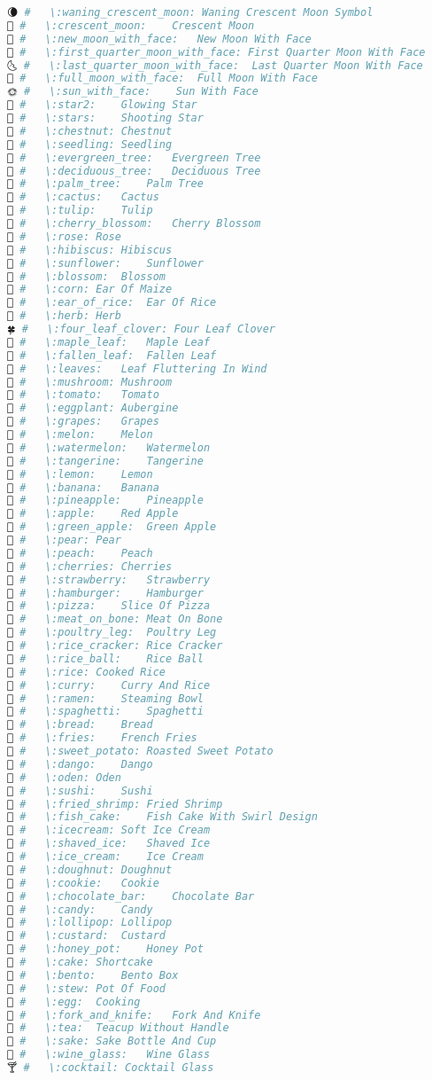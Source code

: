 \begin{lstlisting}[language=Julia]
🌘 #   \:waning_crescent_moon: Waning Crescent Moon Symbol
🌙 #   \:crescent_moon:    Crescent Moon
🌚 #   \:new_moon_with_face:   New Moon With Face
🌛 #   \:first_quarter_moon_with_face: First Quarter Moon With Face
🌜 #   \:last_quarter_moon_with_face:  Last Quarter Moon With Face
🌝 #   \:full_moon_with_face:  Full Moon With Face
🌞 #   \:sun_with_face:    Sun With Face
🌟 #   \:star2:    Glowing Star
🌠 #   \:stars:    Shooting Star
🌰 #   \:chestnut: Chestnut
🌱 #   \:seedling: Seedling
🌲 #   \:evergreen_tree:   Evergreen Tree
🌳 #   \:deciduous_tree:   Deciduous Tree
🌴 #   \:palm_tree:    Palm Tree
🌵 #   \:cactus:   Cactus
🌷 #   \:tulip:    Tulip
🌸 #   \:cherry_blossom:   Cherry Blossom
🌹 #   \:rose: Rose
🌺 #   \:hibiscus: Hibiscus
🌻 #   \:sunflower:    Sunflower
🌼 #   \:blossom:  Blossom
🌽 #   \:corn: Ear Of Maize
🌾 #   \:ear_of_rice:  Ear Of Rice
🌿 #   \:herb: Herb
🍀 #   \:four_leaf_clover: Four Leaf Clover
🍁 #   \:maple_leaf:   Maple Leaf
🍂 #   \:fallen_leaf:  Fallen Leaf
🍃 #   \:leaves:   Leaf Fluttering In Wind
🍄 #   \:mushroom: Mushroom
🍅 #   \:tomato:   Tomato
🍆 #   \:eggplant: Aubergine
🍇 #   \:grapes:   Grapes
🍈 #   \:melon:    Melon
🍉 #   \:watermelon:   Watermelon
🍊 #   \:tangerine:    Tangerine
🍋 #   \:lemon:    Lemon
🍌 #   \:banana:   Banana
🍍 #   \:pineapple:    Pineapple
🍎 #   \:apple:    Red Apple
🍏 #   \:green_apple:  Green Apple
🍐 #   \:pear: Pear
🍑 #   \:peach:    Peach
🍒 #   \:cherries: Cherries
🍓 #   \:strawberry:   Strawberry
🍔 #   \:hamburger:    Hamburger
🍕 #   \:pizza:    Slice Of Pizza
🍖 #   \:meat_on_bone: Meat On Bone
🍗 #   \:poultry_leg:  Poultry Leg
🍘 #   \:rice_cracker: Rice Cracker
🍙 #   \:rice_ball:    Rice Ball
🍚 #   \:rice: Cooked Rice
🍛 #   \:curry:    Curry And Rice
🍜 #   \:ramen:    Steaming Bowl
🍝 #   \:spaghetti:    Spaghetti
🍞 #   \:bread:    Bread
🍟 #   \:fries:    French Fries
🍠 #   \:sweet_potato: Roasted Sweet Potato
🍡 #   \:dango:    Dango
🍢 #   \:oden: Oden
🍣 #   \:sushi:    Sushi
🍤 #   \:fried_shrimp: Fried Shrimp
🍥 #   \:fish_cake:    Fish Cake With Swirl Design
🍦 #   \:icecream: Soft Ice Cream
🍧 #   \:shaved_ice:   Shaved Ice
🍨 #   \:ice_cream:    Ice Cream
🍩 #   \:doughnut: Doughnut
🍪 #   \:cookie:   Cookie
🍫 #   \:chocolate_bar:    Chocolate Bar
🍬 #   \:candy:    Candy
🍭 #   \:lollipop: Lollipop
🍮 #   \:custard:  Custard
🍯 #   \:honey_pot:    Honey Pot
🍰 #   \:cake: Shortcake
🍱 #   \:bento:    Bento Box
🍲 #   \:stew: Pot Of Food
🍳 #   \:egg:  Cooking
🍴 #   \:fork_and_knife:   Fork And Knife
🍵 #   \:tea:  Teacup Without Handle
🍶 #   \:sake: Sake Bottle And Cup
🍷 #   \:wine_glass:   Wine Glass
🍸 #   \:cocktail: Cocktail Glass

\end{lstlisting}
